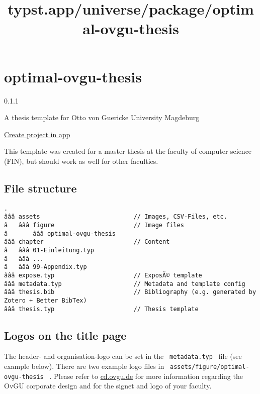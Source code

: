 \title{typst.app/universe/package/optimal-ovgu-thesis}

\label{banner}
\label{template-thumbnail}

\section{optimal-ovgu-thesis}\label{optimal-ovgu-thesis}

{ 0.1.1 }

A thesis template for Otto von Guericke University Magdeburg

\href{/app?template=optimal-ovgu-thesis&version=0.1.1}{Create project in
app}

\label{readme}
This template was created for a master thesis at the faculty of computer
science (FIN), but should work as well for other faculties.

\subsection{File structure}\label{file-structure}

\begin{verbatim}
.
âââ assets                          // Images, CSV-Files, etc. 
â   âââ figure                      // Image files
â       âââ optimal-ovgu-thesis    
âââ chapter                         // Content
â   âââ 01-Einleitung.typ
â   âââ ...
â   âââ 99-Appendix.typ
âââ expose.typ                      // ExposÃ© template
âââ metadata.typ                    // Metadata and template config
âââ thesis.bib                      // Bibliography (e.g. generated by Zotero + Better BibTex)
âââ thesis.typ                      // Thesis template
\end{verbatim}

\subsection{Logos on the title page}\label{logos-on-the-title-page}

The header- and organisation-logo can be set in the
\texttt{\ metadata.typ\ } file (see example below). There are two
example logo files in \texttt{\ assets/figure/optimal-ovgu-thesis\ } .
Please refer to
\href{https://www.cd.ovgu.de/Fakult\%C3\%A4ten.html}{cd.ovgu.de} for
more information regarding the OvGU corporate design and for the signet
and logo of your faculty.

